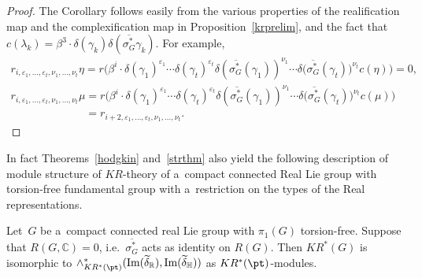 \begin{proof}
The Corollary follows easily from the various properties of the realif\/ication map and the complexif\/ication map in
Proposition~\ref{krprelim}, and the fact that $c(\lambda_k)=\beta^3\cdot\delta(\gamma_k)\delta(\overline{\sigma_G^*}
\gamma_k)$.
For example,
\begin{gather*}
r_{i, \varepsilon_1, \dots, \varepsilon_t, \nu_1, \dots,
\nu_t}\eta=r\big(\beta^i\cdot\delta(\gamma_1)^{\varepsilon_1}\cdots\delta(\gamma_t)^{\varepsilon_t}\delta(\overline{\sigma_G^*}
(\gamma_1))^{\nu_1}\cdots\delta\big(\overline{\sigma_G^*}(\gamma_t)\big)^{\nu_t}c(\eta)\big)
=0,
\\
r_{i, \varepsilon_1, \dots, \varepsilon_t, \nu_1, \dots,\nu_t}\mu
=r\big(\beta^i\cdot\delta(\gamma_1)^{\varepsilon_1}\cdots\delta(\gamma_t)^{\varepsilon_t}\delta(\overline{\sigma_G^*}
(\gamma_1))^{\nu_1}\cdots\delta\big(\overline{\sigma_G^*}(\gamma_t)\big)^{\nu_t}c(\mu)\big)
\\
\phantom{r_{i, \varepsilon_1, \dots, \varepsilon_t, \nu_1, \dots,\nu_t}\mu}
=r_{i+2, \varepsilon_1, \dots, \varepsilon_t, \nu_1, \dots, \nu_t}.\tag*{\qed}
\end{gather*}
\renewcommand{\qed}{}
\end{proof}

In fact Theorems~\ref{hodgkin} and~\ref{strthm} also yield the following description of module structure of
$KR$-theory of a~compact connected Real Lie group with torsion-free fundamental group with a~restriction on the types of
the Real representations.
\begin{Theorem}
\label{spkrtheorymodofg}
Let~$G$ be a~compact connected real Lie group with $\pi_1(G)$ torsion-free.
Suppose that $R(G, \mathbb{C})=0$, i.e.\
$\overline{\sigma_G^*}$ acts as identity on $R(G)$.
Then $KR^*(G)$ is isomorphic to $\wedge_{KR^*(\pt)}^*(\text{\rm Im}(\widetilde{\delta}_\mathbb{R}),
\text{\rm Im}(\widetilde{\delta}_\mathbb{H}))$ as $KR^*(\pt)$-modules.
\end{Theorem}

